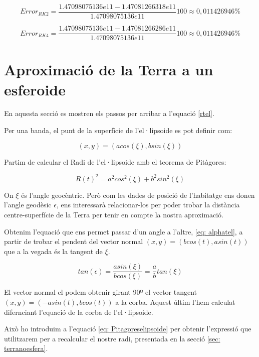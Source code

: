 \documentclass[11pt]{article}
\begin{document}
\begin{equation}
    Error_{RK2} = \frac{1.47098075136e11-1.47081266318e11}{1.47098075136e11}100\approx0,011426946\%
\end{equation}

\begin{equation}
    Error_{RK4} = \frac{1.47098075136e11-1.47081266286e11}{1.47098075136e11}100\approx0,011426946\%
\end{equation}

\section{Aproximació de la Terra a un esferoide}
\label{sec: terraesferoidedibuix}
En aquesta secció es mostren els passos per arribar a l'equació \eqref{rtel}.

Per una banda, el punt de la superfície de l'el·lipsoide es pot definir com:

\begin{equation}
    (x,y) = (acos(\xi),bsin(\xi))
\end{equation}

Partim de calcular el Radi de l'el·lipsoide amb el teorema de Pitàgores:

\begin{equation}
    R(t)^2 = a^2cos^2(\xi) + b^2sin^2(\xi)
    \label{eq: Pitagoreselipsoide}
\end{equation}

On $\xi$ és l'angle geocèntric. Però com les dades de posició de l'habitatge ens donen l'angle geodèsic $\epsilon$, ens interessarà relacionar-los per poder trobar la distància centre-superfície de la Terra per tenir en compte la nostra aproximació.

Obtenim l'equació que ens permet passar d'un angle a l'altre, \eqref{eq: alphatel}, a partir de trobar el pendent del vector normal $(x,y) = (bcos(t), asin(t))$ que a la vegada és la tangent de $\xi$.

\begin{equation}
    tan(\epsilon) = \frac{asin(\xi)}{bcos(\xi)} = \frac{a}{b}tan(\xi)
\end{equation}

El vector normal el podem obtenir girant 90º el vector tangent $(x,y) = (-asin(t),bcos(t))$ a la corba. Aquest últim l'hem calculat difernciant l'equació de la corba de l'el·lipsoide.

Això ho introduim a l'equació \eqref{eq: Pitagoreselipsoide} per obtenir l'expressió que utilitzarem per a recalcular el nostre radi, presentada en la secció \ref{sec: terranoesfera}.
\end{document}
